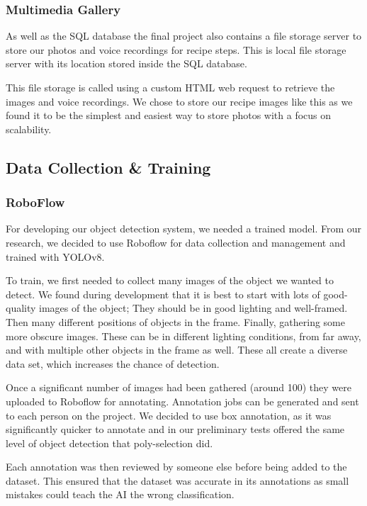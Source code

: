 \documentclass{article}
\begin{document}
\subsubsection{Multimedia Gallery}\label{multimediaGallery}
As well as the SQL database the final project also contains a file storage server to store our photos and voice recordings for recipe steps. This is local file storage server with its location stored inside the SQL database.

This file storage is called using a custom HTML web request to retrieve the images and voice recordings. We chose to store our recipe images like this as we found it to be the simplest and easiest way to store photos with a focus on scalability.

\subsection{Data Collection \& Training}
\subsubsection{RoboFlow}
For developing our object detection system, we needed a trained model. From our research, we decided to use Roboflow for data collection and management and trained with YOLOv8.

To train, we first needed to collect many images of the object we wanted to detect. We found during development that it is best to start with lots of good-quality images of the object; They should be in good lighting and well-framed. Then many different positions of objects in the frame. Finally, gathering some more obscure images. These can be in different lighting conditions, from far away, and with multiple other objects in the frame as well. These all create a diverse data set, which increases the chance of detection.

Once a significant number of images had been gathered (around 100) they were uploaded to Roboflow for annotating. Annotation jobs can be generated and sent to each person on the project. We decided to use box annotation, as it was significantly quicker to annotate and in our preliminary tests offered the same level of object detection that poly-selection did.

Each annotation was then reviewed by someone else before being added to the dataset. This ensured that the dataset was accurate in its annotations as small mistakes could teach the AI the wrong classification.
\end{document}
